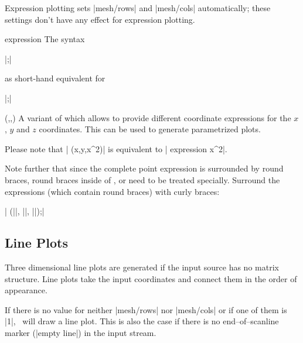 {\begin{addplot3operation}[]{}{}
	Expression plotting sets |mesh/rows| and |mesh/cols| automatically; these settings don't have any effect for expression plotting.
\end{addplot3operation}

\begin{addplot3operation}[]{expression}{}
	The syntax

	 |;|

	as short-hand equivalent for

	 |;|
\end{addplot3operation}

\begin{addplot3operation}[]{(,,)}{}
	A variant of  which allows to provide different coordinate expressions for the $x$, $y$ and $z$ coordinates. This can be used to generate parametrized plots.

	Please note that | (x,y,x^2)| is equivalent to | expression {x^2}|.

	Note further that since the complete point expression is surrounded by round braces, round braces inside of ,  or  need to be treated specially. Surround the expressions (which contain round braces) with curly braces:

	| (||, ||, ||);|
\end{addplot3operation}

\subsection{Line Plots}

Three dimensional line plots are generated if the input source has no matrix structure. Line plots take the input coordinates and connect them in the order of appearance.

\begin{codeexample}[]
\end{codeexample}
If there is no value for neither |mesh/rows| nor |mesh/cols| or if one of them is |1|, \PGFPlots\ will draw a line plot. This is also the case if there is no end--of--scanline marker (|empty line|) in the input stream.

}
